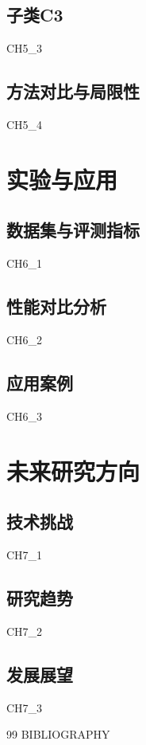 \documentclass[12pt,a4paper]{ctexart}
\begin{document}
\subsection{子类C3}
{CH5_3}

\subsection{方法对比与局限性}
{CH5_4}

\section{实验与应用}
\subsection{数据集与评测指标}
{CH6_1}

\subsection{性能对比分析}
{CH6_2}

\subsection{应用案例}
{CH6_3}

\section{未来研究方向}
\subsection{技术挑战}
{CH7_1}

\subsection{研究趋势}
{CH7_2}

\subsection{发展展望}
{CH7_3}

\begin{thebibliography}{99}
{BIBLIOGRAPHY}
\end{thebibliography}
\end{document}
